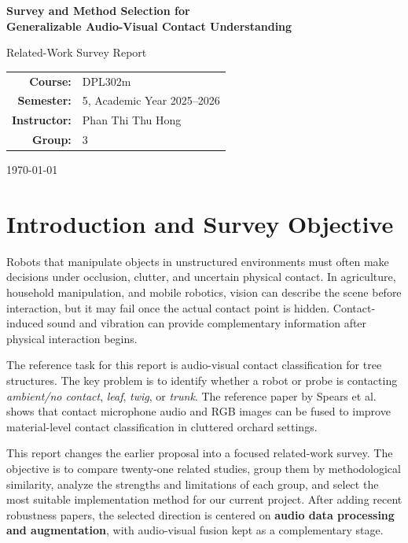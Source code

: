 \documentclass[12pt,a4paper]{article}
\begin{document}
\begin{titlepage}
\centering
\vspace*{2cm}
{\Large\bfseries Survey and Method Selection for\\Generalizable Audio-Visual Contact Understanding\par}
\vspace{1.2cm}
{\large Related-Work Survey Report}\par
\vspace{1.5cm}
\begin{tabular}{rl}
\textbf{Course:} & DPL302m \\
\textbf{Semester:} & 5, Academic Year 2025--2026 \\
\textbf{Instructor:} & Phan Thi Thu Hong \\
\textbf{Group:} & 3 \\
\end{tabular}
\vspace{1.2cm}
\vfill
{\today}
\end{titlepage}

\section{Introduction and Survey Objective}

Robots that manipulate objects in unstructured environments must often make decisions under occlusion, clutter, and uncertain physical contact. In agriculture, household manipulation, and mobile robotics, vision can describe the scene before interaction, but it may fail once the actual contact point is hidden. Contact-induced sound and vibration can provide complementary information after physical interaction begins.

The reference task for this report is audio-visual contact classification for tree structures. The key problem is to identify whether a robot or probe is contacting \textit{ambient/no contact}, \textit{leaf}, \textit{twig}, or \textit{trunk}. The reference paper by Spears et al.~\cite{spears2025tree} shows that contact microphone audio and RGB images can be fused to improve material-level contact classification in cluttered orchard settings.

This report changes the earlier proposal into a focused related-work survey. The objective is to compare twenty-one related studies, group them by methodological similarity, analyze the strengths and limitations of each group, and select the most suitable implementation method for our current project. After adding recent robustness papers, the selected direction is centered on \textbf{audio data processing and augmentation}, with audio-visual fusion kept as a complementary stage.
\end{document}
